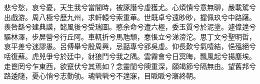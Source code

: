 
\begin{pinyinscope}
悲兮愁，哀兮憂，天生我兮當闇時，被諑譖兮虛獲尤。心煩憒兮意無聊，嚴載駕兮出戲游。周八極兮歷九州，求軒轅兮索重華。世既卓兮遠眇眇，握佩玖兮中路躇。羨咎繇兮建典謨，懿風後兮受瑞圖。愍余命兮遭六極，委玉質兮於泥塗。遽傽遑兮驅林澤，步屏營兮行丘阿。車軏折兮馬虺頹，惷悵立兮涕滂沱。思丁文兮聖明哲，哀平差兮迷謬愚。呂傅舉兮殷周興，忌嚭專兮郢吳虛。仰長歎兮氣噎結，悒殟絕兮咶復蘇。虎兕爭兮於廷中，豺狼鬥兮我之隅。雲霧會兮日冥晦，飄風起兮揚塵埃。走鬯罔兮乍東西，欲竄伏兮其焉如？念靈閨兮隩重深，願竭節兮隔無由。望舊邦兮路逶隨，憂心悄兮志勤劬。魂煢煢兮不遑寐，目眽眽兮寤終朝。


\end{pinyinscope}